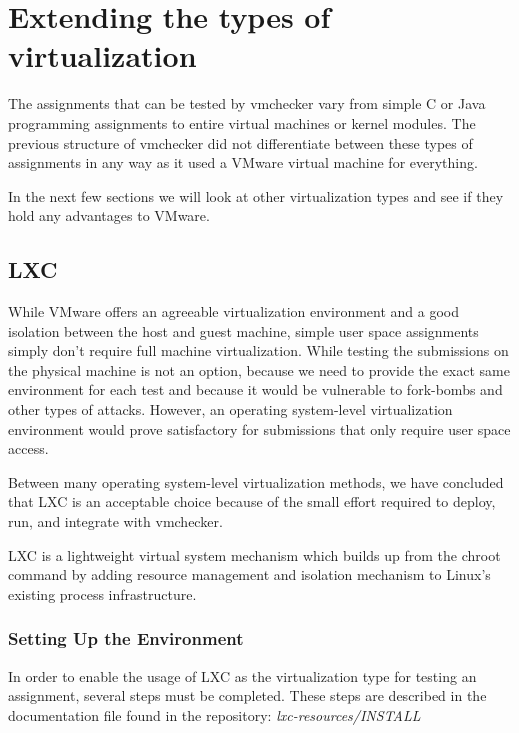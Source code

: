 \chapter{Extending the types of virtualization}
\label{chapter:virt-types}

The assignments that can be tested by vmchecker vary from simple C or Java
programming assignments to entire virtual machines or kernel modules.
The previous structure of vmchecker did not differentiate between these types of
assignments in any way as it used a VMware virtual machine for everything.

In the next few sections we will look at other virtualization types and see if
they hold any advantages to VMware.

\section{LXC}
\label{sec:vmc-lxc}

While VMware offers an agreeable virtualization environment and a good isolation
between the host and guest machine, simple user space assignments simply don't 
require full machine virtualization. While testing the submissions on the 
physical machine is not an option, because we need to provide the exact same
environment for each test and because it would be vulnerable to fork-bombs and 
other types of attacks. However, an operating system-level virtualization 
environment would prove satisfactory for submissions that only require user space
access.

Between many operating system-level virtualization methods, we have concluded
that LXC is an acceptable choice because of the small effort required to 
deploy, run, and integrate with vmchecker.

LXC is a lightweight virtual system mechanism which builds up from the chroot
command by adding resource management and isolation mechanism to Linux's 
existing process infrastructure.

\subsection {Setting Up the Environment}
\label{sub-sec:vmc-lxc-env}

In order to enable the usage of LXC as the virtualization type for testing an 
assignment, several steps must be completed. These steps are described in the 
documentation file found in the repository: \textit{lxc-resources/INSTALL}

